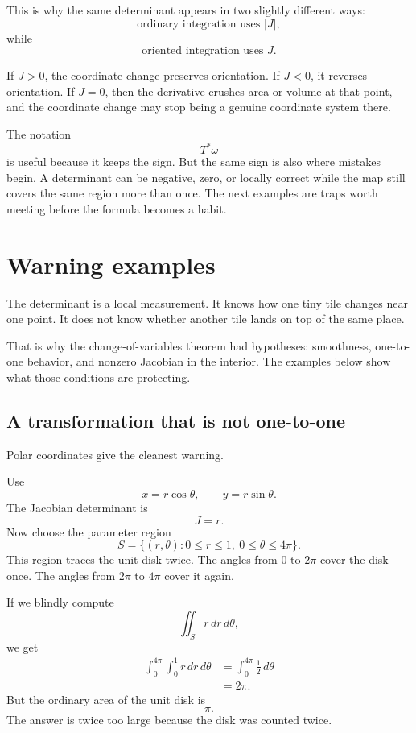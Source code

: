 This is why the same determinant appears in two slightly different ways:
\[
    \text{ordinary integration uses } |J|,
\]
while
\[
    \text{oriented integration uses } J.
\]

If \(J>0\), the coordinate change preserves orientation.  If \(J<0\), it reverses
orientation.  If \(J=0\), then the derivative crushes area or volume at that point, and
the coordinate change may stop being a genuine coordinate system there.

The notation
\[
    T^*\omega
\]
is useful because it keeps the sign.  But the same sign is also where mistakes begin.
A determinant can be negative, zero, or locally correct while the map still covers the
same region more than once.  The next examples are traps worth meeting before the
formula becomes a habit.

\section{Warning examples}
\label{sec:12.6}

The determinant is a local measurement.  It knows how one tiny tile changes near one
point.  It does not know whether another tile lands on top of the same place.

That is why the change-of-variables theorem had hypotheses: smoothness, one-to-one
behavior, and nonzero Jacobian in the interior.  The examples below show what those
conditions are protecting.

\subsection{A transformation that is not one-to-one}

Polar coordinates give the cleanest warning.

Use
\[
    x=r\cos\theta,
    \qquad
    y=r\sin\theta.
\]
The Jacobian determinant is
\[
    J=r.
\]
Now choose the parameter region
\[
    S=\{(r,\theta):0\le r\le1,\ 0\le\theta\le4\pi\}.
\]
This region traces the unit disk twice.  The angles from \(0\) to \(2\pi\) cover the disk
once.  The angles from \(2\pi\) to \(4\pi\) cover it again.

If we blindly compute
\[
    \iint_S r\,dr\,d\theta,
\]
we get
\[
\begin{aligned}
    \int_0^{4\pi}\int_0^1 r\,dr\,d\theta
    &=
    \int_0^{4\pi}\frac12\,d\theta\\
    &=
    2\pi.
\end{aligned}
\]
But the ordinary area of the unit disk is
\[
    \pi.
\]
The answer is twice too large because the disk was counted twice.

